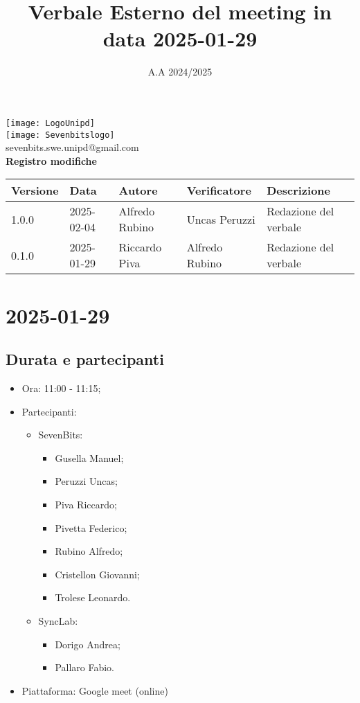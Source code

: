 \documentclass[10pt]{article}
\title{Verbale Esterno del meeting in data 2025-01-29}
\date{A.A 2024/2025}
\begin{document}
\maketitle
\begin{center}
\texttt{[image: LogoUnipd]}\\
\texttt{[image: Sevenbitslogo]}\\
sevenbits.swe.unipd@gmail.com\\
\vspace{2mm}
\textbf{Registro modifiche}\\
\vspace{2mm}
\begin{tabularx}{\textwidth}{|l|l|l|l|X|}
\hline
\textbf{Versione} & \textbf{Data} & \textbf{Autore} & \textbf{Verificatore} & \textbf{Descrizione} \\
\hline
1.0.0 & 2025-02-04 & Alfredo Rubino & Uncas Peruzzi & Redazione del verbale \\
\hline
0.1.0 & 2025-01-29 & Riccardo Piva & Alfredo Rubino & Redazione del verbale \\
\hline
\end{tabularx}
\end{center}
\newpage
\tableofcontents
\newpage
\section{2025-01-29}
\subsection{Durata e partecipanti}
\begin{itemize}
\item Ora: 11:00 - 11:15;
\item Partecipanti:
	\begin{itemize}
	\item 	SevenBits:
			\begin{itemize}
				\item Gusella Manuel;
				\item Peruzzi Uncas;
				\item Piva Riccardo;
				\item Pivetta Federico;
				\item Rubino Alfredo;
				\item Cristellon Giovanni;
				\item Trolese Leonardo.
			\end{itemize}
	\item 	SyncLab:
			\begin{itemize}
				\item Dorigo Andrea;
				\item Pallaro Fabio.
			\end{itemize}
	\end{itemize}
\item Piattaforma: Google meet (online)
\end{itemize}
\end{document}
